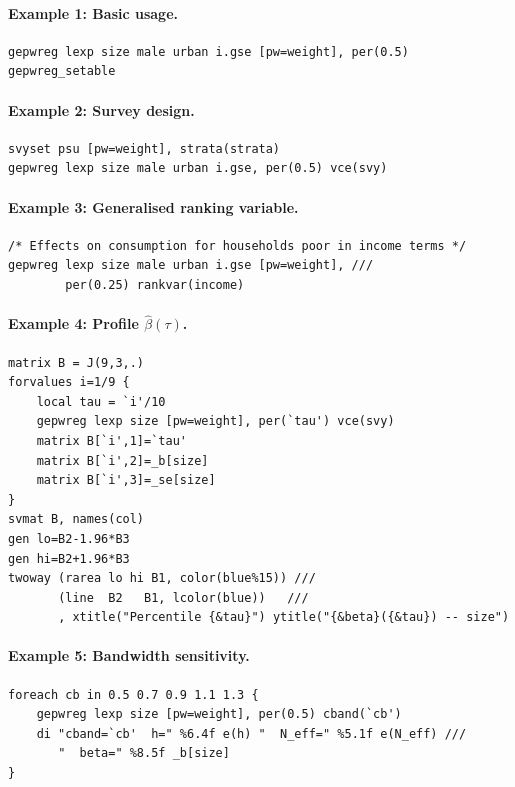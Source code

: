 \documentclass[12pt,a4paper]{article}
\theoremstyle{definition}
\begin{document}
\paragraph{Example 1: Basic usage.}
\begin{verbatim}
gepwreg lexp size male urban i.gse [pw=weight], per(0.5)
gepwreg_setable
\end{verbatim}

\paragraph{Example 2: Survey design.}
\begin{verbatim}
svyset psu [pw=weight], strata(strata)
gepwreg lexp size male urban i.gse, per(0.5) vce(svy)
\end{verbatim}

\paragraph{Example 3: Generalised ranking variable.}
\begin{verbatim}
/* Effects on consumption for households poor in income terms */
gepwreg lexp size male urban i.gse [pw=weight], ///
        per(0.25) rankvar(income)
\end{verbatim}

\paragraph{Example 4: Profile $\hat\beta(\tau)$.}
\begin{verbatim}
matrix B = J(9,3,.)
forvalues i=1/9 {
    local tau = `i'/10
    gepwreg lexp size [pw=weight], per(`tau') vce(svy)
    matrix B[`i',1]=`tau'
    matrix B[`i',2]=_b[size]
    matrix B[`i',3]=_se[size]
}
svmat B, names(col)
gen lo=B2-1.96*B3
gen hi=B2+1.96*B3
twoway (rarea lo hi B1, color(blue%15)) ///
       (line  B2   B1, lcolor(blue))   ///
       , xtitle("Percentile {&tau}") ytitle("{&beta}({&tau}) -- size")
\end{verbatim}

\paragraph{Example 5: Bandwidth sensitivity.}
\begin{verbatim}
foreach cb in 0.5 0.7 0.9 1.1 1.3 {
    gepwreg lexp size [pw=weight], per(0.5) cband(`cb')
    di "cband=`cb'  h=" %6.4f e(h) "  N_eff=" %5.1f e(N_eff) ///
       "  beta=" %8.5f _b[size]
}
\end{verbatim}
\end{document}
